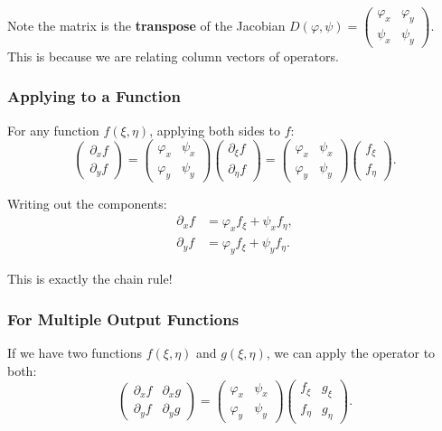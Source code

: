 \documentclass[11pt]{report}
\begin{document}
\begin{remark}
Note the matrix is the \textbf{transpose} of the Jacobian $D(\varphi, \psi) = \begin{pmatrix} \varphi_x & \varphi_y \\ \psi_x & \psi_y \end{pmatrix}$. This is because we are relating column vectors of operators.
\end{remark}

\subsubsection*{Applying to a Function}

For any function $f(\xi, \eta)$, applying both sides to $f$:
\[
\begin{pmatrix} \partial_x f \\ \partial_y f \end{pmatrix} = \begin{pmatrix} \varphi_x & \psi_x \\ \varphi_y & \psi_y \end{pmatrix} \begin{pmatrix} \partial_\xi f \\ \partial_\eta f \end{pmatrix} = \begin{pmatrix} \varphi_x & \psi_x \\ \varphi_y & \psi_y \end{pmatrix} \begin{pmatrix} f_\xi \\ f_\eta \end{pmatrix}.
\]

Writing out the components:
\begin{align*}
\partial_x f &= \varphi_x f_\xi + \psi_x f_\eta, \\
\partial_y f &= \varphi_y f_\xi + \psi_y f_\eta.
\end{align*}

This is exactly the chain rule!

\subsubsection*{For Multiple Output Functions}

If we have two functions $f(\xi, \eta)$ and $g(\xi, \eta)$, we can apply the operator to both:
\[
\begin{pmatrix} \partial_x f & \partial_x g \\ \partial_y f & \partial_y g \end{pmatrix} = \begin{pmatrix} \varphi_x & \psi_x \\ \varphi_y & \psi_y \end{pmatrix} \begin{pmatrix} f_\xi & g_\xi \\ f_\eta & g_\eta \end{pmatrix}.
\]
\end{document}

